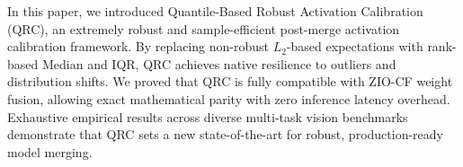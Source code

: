 \documentclass{article}
\theoremstyle{plain}
\theoremstyle{definition}
\theoremstyle{remark}
\begin{document}
In this paper, we introduced Quantile-Based Robust Activation Calibration (QRC), an extremely robust and sample-efficient post-merge activation calibration framework. By replacing non-robust $L_2$-based expectations with rank-based Median and IQR, QRC achieves native resilience to outliers and distribution shifts. We proved that QRC is fully compatible with ZIO-CF weight fusion, allowing exact mathematical parity with zero inference latency overhead. Exhaustive empirical results across diverse multi-task vision benchmarks demonstrate that QRC sets a new state-of-the-art for robust, production-ready model merging.



\end{document}
